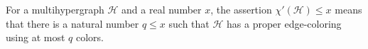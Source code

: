 \begin{definition}
For a multihypergraph $\mathcal H$ and a real number $x$, the assertion
$\chi'(\mathcal H)\le x$ means that there is a natural number $q\le x$ such
that $\mathcal H$ has a proper edge-coloring using at most $q$ colors.
\end{definition}
